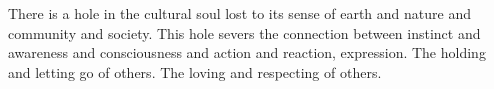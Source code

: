 

There is a hole in the cultural soul lost to its sense of earth and
nature and community and society.  This hole severs the connection
between instinct and awareness and consciousness and action and
reaction, expression.  The holding and letting go of others.  The
loving and respecting of others.  

\bye
